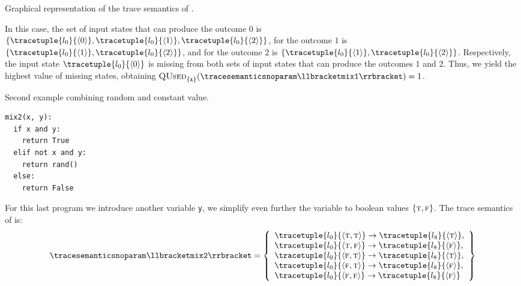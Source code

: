 \begin{example}
\begin{marginfigure}[*-2]
  \caption{Graphical representation of the trace semantics of .}
  \end{marginfigure}
  In this case, the set of input states that can produce the outcome $0$ is $\{\tracetuple{\locinit}{\langle 0\rangle}, \tracetuple{\locinit}{\langle 1\rangle}, \tracetuple{\locinit}{\langle 2\rangle}\}$, for the outcome $1$ is $\{\tracetuple{\locinit}{\langle 1\rangle}, \tracetuple{\locinit}{\langle 2\rangle}\}$, and for the outcome $2$ is $\{\tracetuple{\locinit}{\langle 1\rangle}, \tracetuple{\locinit}{\langle 2\rangle}\}$.
  Respectively, the input state $\tracetuple{\locinit}{\langle 0 \rangle}$ is missing from both sets of input states that can produce the outcomes $1$ and $2$.
  Thus, we yield the highest value of missing states, obtaining $\qusedname_{\{\texttt{x}\}}(\tracesemanticsnoparam\semanticsof{\texttt{mix1}})=1$.


  \begin{marginlisting}
    \caption{Second example combining random and constant value.}
    \vspace{25pt}
  \begin{lstlisting}[language=customPython]
mix2(x, y):
  if x and y:
    return True
  elif not x and y:
    return rand()
  else:
    return False
 \end{lstlisting}
  \end{marginlisting}
  For this last program we introduce another variable \texttt{y}, we simplify even further the variable to boolean values $\{\textsc{t}, \textsc{f}\}$.
  The trace semantics of  is:
  \begin{align*}
    \tracesemanticsnoparam\semanticsof{\texttt{mix2}}
    =
    \left\{
      \begin{array}{l}
        \tracetuple{\locinit}{\langle \true, \true\rangle}\rightarrow\tracetuple{\loc{8}}{\langle \true\rangle}, \\
        \tracetuple{\locinit}{\langle \true, \false\rangle}\rightarrow\tracetuple{\loc{8}}{\langle \false\rangle}, \\
        \tracetuple{\locinit}{\langle \false, \true\rangle}\rightarrow\tracetuple{\loc{8}}{\langle \true\rangle}, \\
        \tracetuple{\locinit}{\langle \false, \true\rangle}\rightarrow\tracetuple{\loc{8}}{\langle \false\rangle}, \\
        \tracetuple{\locinit}{\langle \false, \false\rangle}\rightarrow\tracetuple{\loc{8}}{\langle \false\rangle}
      \end{array}
      \right\}
  \end{align*}
  \begin{marginfigure}
\end{marginfigure}
\end{example}
